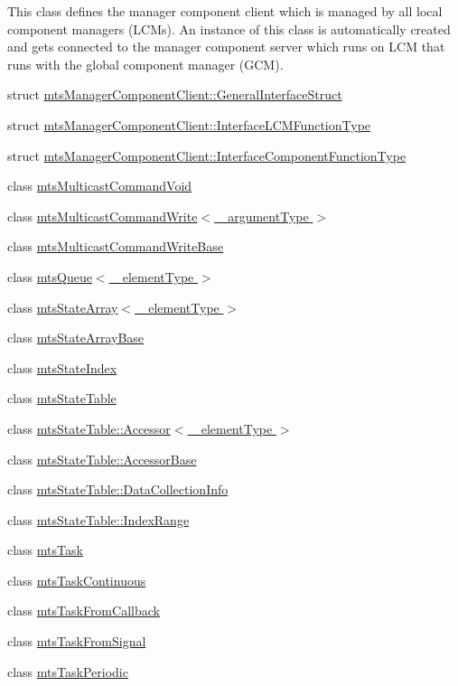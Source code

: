 \begin{DoxyCompactItemize}
\begin{DoxyCompactList}
This class defines the manager component client which is managed by all local component managers (L\+C\+Ms). An instance of this class is automatically created and gets connected to the manager component server which runs on L\+C\+M that runs with the global component manager (G\+C\+M). \end{DoxyCompactList}\item 
struct \hyperlink{structmts_manager_component_client_1_1_general_interface_struct}{mts\+Manager\+Component\+Client\+::\+General\+Interface\+Struct}
\item 
struct \hyperlink{structmts_manager_component_client_1_1_interface_l_c_m_function_type}{mts\+Manager\+Component\+Client\+::\+Interface\+L\+C\+M\+Function\+Type}
\item 
struct \hyperlink{structmts_manager_component_client_1_1_interface_component_function_type}{mts\+Manager\+Component\+Client\+::\+Interface\+Component\+Function\+Type}
\item 
class \hyperlink{classmts_multicast_command_void}{mts\+Multicast\+Command\+Void}
\item 
class \hyperlink{classmts_multicast_command_write}{mts\+Multicast\+Command\+Write$<$ \+\_\+argument\+Type $>$}
\item 
class \hyperlink{classmts_multicast_command_write_base}{mts\+Multicast\+Command\+Write\+Base}
\item 
class \hyperlink{classmts_queue}{mts\+Queue$<$ \+\_\+element\+Type $>$}
\item 
class \hyperlink{classmts_state_array}{mts\+State\+Array$<$ \+\_\+element\+Type $>$}
\item 
class \hyperlink{classmts_state_array_base}{mts\+State\+Array\+Base}
\item 
class \hyperlink{classmts_state_index}{mts\+State\+Index}
\item 
class \hyperlink{classmts_state_table}{mts\+State\+Table}
\item 
class \hyperlink{classmts_state_table_1_1_accessor}{mts\+State\+Table\+::\+Accessor$<$ \+\_\+element\+Type $>$}
\item 
class \hyperlink{classmts_state_table_1_1_accessor_base}{mts\+State\+Table\+::\+Accessor\+Base}
\item 
class \hyperlink{classmts_state_table_1_1_data_collection_info}{mts\+State\+Table\+::\+Data\+Collection\+Info}
\item 
class \hyperlink{classmts_state_table_1_1_index_range}{mts\+State\+Table\+::\+Index\+Range}
\item 
class \hyperlink{classmts_task}{mts\+Task}
\item 
class \hyperlink{classmts_task_continuous}{mts\+Task\+Continuous}
\item 
class \hyperlink{classmts_task_from_callback}{mts\+Task\+From\+Callback}
\item 
class \hyperlink{classmts_task_from_signal}{mts\+Task\+From\+Signal}
\item 
class \hyperlink{classmts_task_periodic}{mts\+Task\+Periodic}
\end{DoxyCompactItemize}
